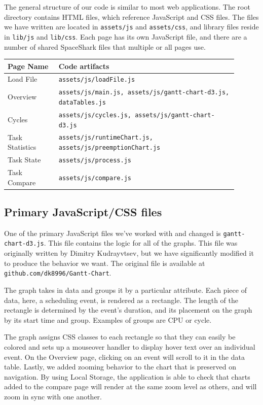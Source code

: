 \documentclass{hmcclinic}
\begin{document}
  The general structure of our code is similar to most web applications. 
  The root directory contains HTML files, which reference JavaScript and CSS files. The files
  we have written are located in \texttt{assets/js} and \texttt{assets/css}, and
  library files reside in \texttt{lib/js} and \texttt{lib/css}.  Each page has
  its own JavaScript file, and there are a number of shared SpaceShark files that
  multiple or all pages use.
  

  \begin{center}
    \begin{tabular}{p{0.2\linewidth}p{0.7\linewidth}}
     \toprule
      Page Name       & Code artifacts     \\
      \midrule
      Load File       & \texttt{assets/js/loadFile.js}\\
      Overview        & \texttt{assets/js/main.js, assets/js/gantt-chart-d3.js, dataTables.js}\\
      Cycles          & \texttt{assets/js/cycles.js, assets/js/gantt-chart-d3.js}\\
      Task Statistics & \texttt{assets/js/runtimeChart.js, assets/js/preemptionChart.js}\\
      Task State      & \texttt{assets/js/process.js}\\
      Task Compare    & \texttt{assets/js/compare.js}\\
    \bottomrule
    \end{tabular}
  \end{center}


  \subsection{Primary JavaScript/CSS files}
  One of the primary JavaScript files we've worked
  with and changed is \texttt{gantt-chart-d3.js}. This file contains the logic for all of the
  graphs. This file was originally written by Dimitry Kudrayvtsev, %
 but we have significantly modified it to produce the behavior we want. The
 original file is available at \texttt{github.com/dk8996/Gantt-Chart}.

  The graph takes in data and groups it by a particular attribute. Each piece
  of data, here, a scheduling event, is rendered as a rectangle. The
  length of the rectangle is determined by the event's duration, and its
  placement on the graph by its start time and group. Examples of groups are
  CPU or cycle.

  The graph assigns CSS classes to each rectangle so that they can easily be
  colored and sets up a mouseover handler to display hover text
  over an individual event. On the Overview page, clicking
  on an event will scroll to it in the data table.
  Lastly, we added zooming behavior to the chart that is
  preserved on navigation. By using Local Storage, the application is
  able to check that charts added to the compare page will render at the
  same zoom level as others, and will zoom in sync with one another.
\end{document}

